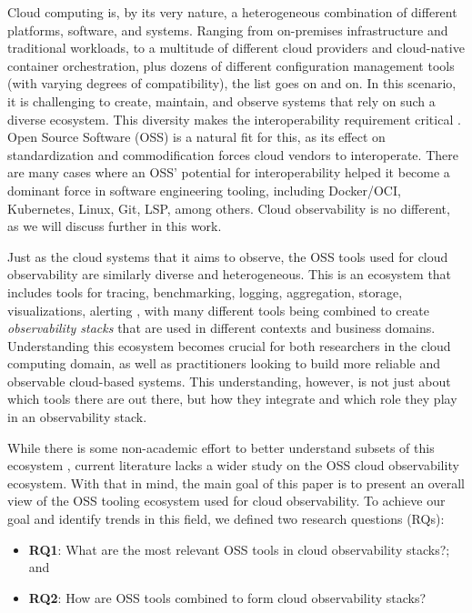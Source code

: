 \documentclass[sigconf]{acmart}
\begin{document}
Cloud computing is, by its very nature, a heterogeneous combination of different
platforms, software, and systems. Ranging from on-premises infrastructure
and traditional workloads, to a multitude of different cloud providers and
cloud-native container orchestration, plus dozens of different configuration
management tools (with varying degrees of compatibility), the list goes on and
on. In this scenario, it is challenging to create, maintain, and observe systems
that rely on such a diverse ecosystem. This diversity makes the interoperability
requirement critical \cite{6133225} \cite{6480040}. Open Source Software (OSS)
is a natural fit for this, as its effect on standardization and commodification
\cite{Linden2009} forces cloud vendors to interoperate. There are many cases
where an OSS' potential for interoperability helped it become a dominant force
in software engineering tooling, including Docker/OCI, Kubernetes, Linux, Git,
LSP, among others. Cloud observability is no different, as we will discuss
further in this work.

Just as the cloud systems that it aims to observe, the OSS tools used for cloud
observability are similarly diverse and heterogeneous. This is an ecosystem
that includes tools for tracing, benchmarking, logging, aggregation, storage,
visualizations, alerting \cite{beyer2016site}, with many different tools being
combined to create \emph{observability stacks} that are used in different
contexts and business domains. Understanding this ecosystem becomes crucial for
both researchers in the cloud computing domain, as well as practitioners looking
to build more reliable and observable cloud-based systems. This understanding,
however, is not just about which tools there are out there, but how they
integrate and which role they play in an observability stack.

While there is some non-academic effort to better understand subsets of
this ecosystem \cite{cnf-landscape}, current literature lacks a
wider study on the OSS cloud observability ecosystem. With that in
mind, the main goal of this paper is to present an overall view of the
OSS tooling ecosystem used for cloud observability. To achieve our goal
and identify trends in this field, we defined two research questions
(RQs):

\begin{itemize}
\item
  \textbf{RQ1}: What are the most relevant OSS tools in cloud
  observability stacks?; and
\item
  \textbf{RQ2}: How are OSS tools combined to form cloud observability
  stacks?
\end{itemize}
\end{document}
